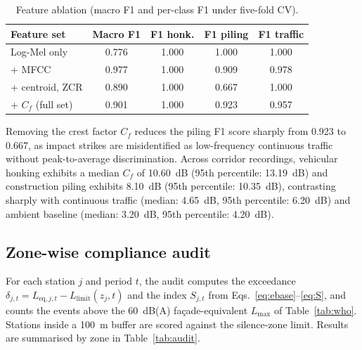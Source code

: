 \documentclass[conference]{IEEEtran}
\newcommand{\Lmax}{L_{\max}}
\newcommand{\Cf}{C_f}
\begin{document}
\begin{table}[!t]
\caption{Feature ablation (macro F1 and per-class F1 under five-fold CV).}
\label{tab:ablation}
\centering
\footnotesize
\renewcommand{\arraystretch}{1.15}
\begin{tabular}{@{}lcccc@{}}
\toprule
Feature set & Macro F1 & F1 honk. & F1 piling & F1 traffic \\
\midrule
Log-Mel only & 0.776 & 1.000 & 1.000 & 1.000 \\
+ MFCC & 0.977 & 1.000 & 0.909 & 0.978 \\
+ centroid, ZCR & 0.890 & 1.000 & 0.667 & 1.000 \\
+ $\Cf$ (full set) & 0.901 & 1.000 & 0.923 & 0.957 \\
\bottomrule
\end{tabular}
\end{table}

Removing the crest factor $\Cf$ reduces the piling F1 score sharply from 0.923 to 0.667, as impact strikes are misidentified as low-frequency continuous traffic without peak-to-average discrimination. Across corridor recordings, vehicular honking exhibits a median $\Cf$ of 10.60~dB (95th percentile: 13.19~dB) and construction piling exhibits 8.10~dB (95th percentile: 10.35~dB), contrasting sharply with continuous traffic (median: 4.65~dB, 95th percentile: 6.20~dB) and ambient baseline (median: 3.20~dB, 95th percentile: 4.20~dB).

\subsection{Zone-wise compliance audit}

For each station $j$ and period $t$, the audit computes the exceedance $\delta_{j,t}=L_{\text{eq},j,t}-L_{\text{limit}}(z_j,t)$ and the index $S_{j,t}$ from Eqs.~\eqref{eq:ebase}--\eqref{eq:S}, and counts the events above the 60~dB(A) fa\c{c}ade-equivalent $\Lmax$ of Table~\ref{tab:who}. Stations inside a 100~m buffer are scored against the silence-zone limit. Results are summarised by zone in Table~\ref{tab:audit}.
\end{document}
